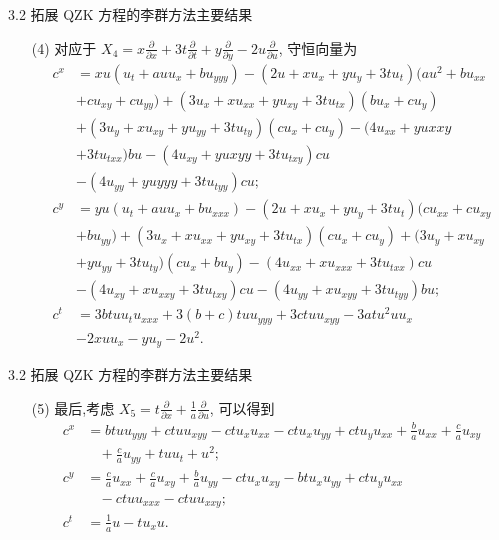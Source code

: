 \documentclass{beamer}
\begin{document}
\begin{frame}{3.2 拓展 QZK 方程的李群方法主要结果}
\begin{itemize}
\item[(4)] 对应于 $X_{4}=x\frac{\partial}{\partial x}+3t\frac{\partial}{\partial t}+y\frac{\partial}{\partial y}-2u\frac{\partial}{\partial u}$, 守恒向量为
\begin{equation*}
\begin{aligned}
c^{x}&=xu(u_{t}+auu_{x}+bu_{yyy})-(2u+xu_{x}+yu_{y}+3tu_{t})(au^2+bu_{xx}\\
&+cu_{xy}+cu_{yy})+(3u_{x}+xu_{xx}+yu_{xy}+3tu_{tx})(bu_{x}+cu_{y})\\
&+(3u_{y}+xu_{xy}+yu_{yy}+3tu_{ty})(cu_{x}+cu_{y})-(4u_{xx}+yu{xxy}\\
&+3tu_{txx})bu-(4u_{xy}+yu{xyy}+3tu_{txy})cu\\
&-(4u_{yy}+yu{yyy}+3tu_{tyy})cu;\\
c^{y}&=yu(u_{t}+auu_{x}+bu_{xxx})-(2u+xu_{x}+yu_{y}+3tu_{t})(cu_{xx}+cu_{xy}\\
&+bu_{yy})+(3u_{x}+xu_{xx}+yu_{xy}+3tu_{tx})(cu_{x}+cu_{y})+(3u_{y}+xu_{xy}\\
&+yu_{yy}+3tu_{ty})(cu_{x}+bu_{y})-(4u_{xx}+xu_{xxx}+3tu_{txx})cu\\
&-(4u_{xy}+xu_{xxy}+3tu_{txy})cu-(4u_{yy}+xu_{xyy}+3tu_{tyy})bu;\\
c^{t}&=3btuu_{t}u_{xxx}+3(b+c)tuu_{yyy}+3ctuu_{xyy}-3atu^2uu_x\\
&-2xuu_x-yu_y-2u^2.
\end{aligned}
\end{equation*}
\end{itemize}
\end{frame}

\begin{frame}{3.2 拓展 QZK 方程的李群方法主要结果}
\begin{itemize}
\item[(5)] 最后,考虑 $X_{5}=t\frac{\partial}{\partial x}+\frac{1}{a}\frac{\partial}{\partial u}$, 可以得到
\begin{equation*}
\begin{aligned}
c^{x}&=btuu_{yyy}+ctuu_{xyy}-ctu_{x}u_{xx}-ctu_{x}u_{yy}+ctu_{y}u_{xx}+\frac{b}{a}u_{xx}+\frac{c}{a}u_{xy}\\
&~~~~+\frac{c}{a}u_{yy}+tuu_t+u^2;\\
c^{y}&=\frac{c}{a}u_{xx}+\frac{c}{a}u_{xy}+\frac{b}{a}u_{yy}-ctu_{x}u_{xy}-btu_{x}u_{yy}+ctu_{y}u_{xx}\\
&~~~~-ctuu_{xxx}-ctuu_{xxy};\\
c^{t}&=\frac{1}{a}u-tu_{x}u.\\
\end{aligned}
\end{equation*}
\end{itemize}
\end{frame}
\end{document}
